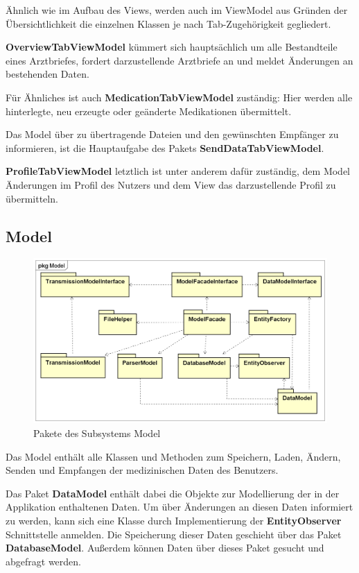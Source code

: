 \documentclass[a4paper]{scrreprt}
\begin{document}
Ähnlich wie im Aufbau des Views, werden auch im ViewModel aus Gründen der Übersichtlichkeit die einzelnen Klassen je nach Tab-Zugehörigkeit gegliedert.

\textbf{OverviewTabViewModel} kümmert sich hauptsächlich um alle Bestandteile eines Arztbriefes, fordert darzustellende Arztbriefe an und meldet Änderungen an bestehenden Daten.

Für Ähnliches ist auch \textbf{MedicationTabViewModel} zuständig: Hier werden alle hinterlegte, neu erzeugte oder geänderte Medikationen übermittelt.

Das Model über zu übertragende Dateien und den gewünschten Empfänger zu informieren, ist die Hauptaufgabe des Pakets \textbf{SendDataTabViewModel}.

\textbf{ProfileTabViewModel} letztlich ist unter anderem dafür zuständig, dem Model Änderungen im Profil des Nutzers und dem View das darzustellende Profil zu übermitteln.

\subsection{Model}
\begin{figure}[H]
\centering
\includegraphics[width=0.75\textheight]{graphics/Klassendiagramme/Model/ModelPackage.png}
\caption{Pakete des Subsystems Model}
\end{figure}
Das Model enthält alle Klassen und Methoden zum Speichern, Laden, Ändern, Senden und Empfangen der medizinischen Daten des Benutzers. 

Das Paket \textbf{DataModel} enthält dabei die Objekte zur Modellierung der in der Applikation enthaltenen Daten. Um über Änderungen an diesen Daten informiert zu werden, kann sich eine Klasse durch Implementierung der \textbf{EntityObserver} Schnittstelle anmelden.
Die Speicherung dieser Daten geschieht über das Paket \textbf{DatabaseModel}. Außerdem 
können Daten über dieses Paket gesucht und abgefragt werden.
\end{document}
